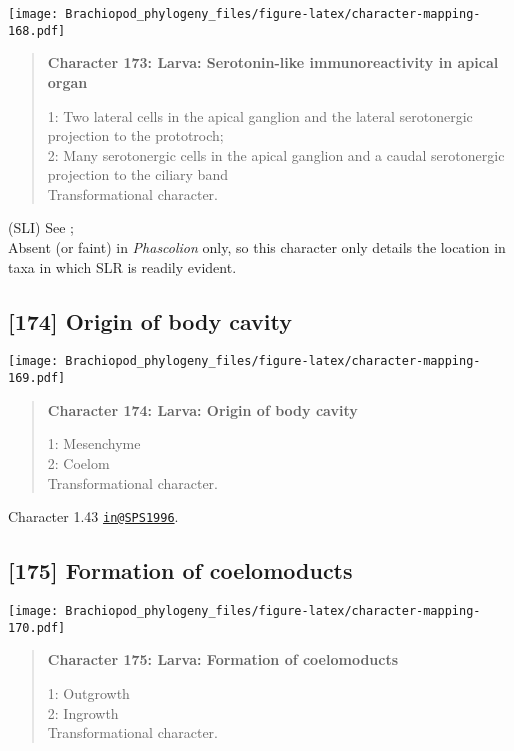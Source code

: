 \documentclass[openany]{book}
\theoremstyle{definition}
\theoremstyle{definition}
\theoremstyle{definition}
\theoremstyle{remark}
\begin{document}
\texttt{[image: Brachiopod\_phylogeny\_files/figure-latex/character-mapping-168.pdf]}

\begin{quote}
\textbf{Character 173: Larva: Serotonin-like immunoreactivity in apical
organ}

1: Two lateral cells in the apical ganglion and the lateral serotonergic
projection to the prototroch;\\
2: Many serotonergic cells in the apical ganglion and a caudal
serotonergic projection to the ciliary band\\
Transformational character.
\end{quote}

(SLI) See \citet{Haszprunar2000}; \citet{Richter2010}\\
Absent (or faint) in \emph{Phascolion} only, so this character only
details the location in taxa in which SLR is readily evident.

\subsection*{{[}174{]} Origin of body
cavity}\label{origin-of-body-cavity}

\texttt{[image: Brachiopod\_phylogeny\_files/figure-latex/character-mapping-169.pdf]}

\begin{quote}
\textbf{Character 174: Larva: Origin of body cavity}

1: Mesenchyme\\
2: Coelom\\
Transformational character.
\end{quote}

Character 1.43 \href{mailto:in@SPS1996}{\nolinkurl{in@SPS1996}}.

\subsection*{{[}175{]} Formation of
coelomoducts}\label{formation-of-coelomoducts}

\texttt{[image: Brachiopod\_phylogeny\_files/figure-latex/character-mapping-170.pdf]}

\begin{quote}
\textbf{Character 175: Larva: Formation of coelomoducts}

1: Outgrowth\\
2: Ingrowth\\
Transformational character.
\end{quote}
\end{document}
